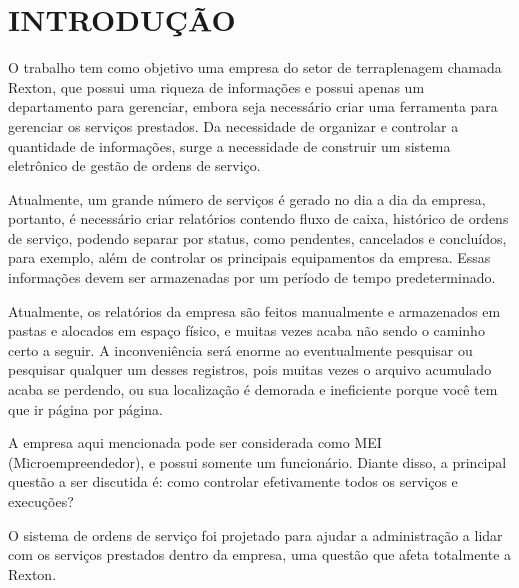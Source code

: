 \chapter*[INTRODUÇÃO]{INTRODUÇÃO}
O trabalho tem como objetivo uma empresa do setor de terraplenagem chamada Rexton, que possui uma riqueza de informações e possui apenas um departamento para gerenciar, embora seja necessário criar uma ferramenta para gerenciar os serviços prestados. Da necessidade de organizar e controlar a quantidade de informações, surge a necessidade de construir um sistema eletrônico de gestão de ordens de serviço.

Atualmente, um grande número de serviços é gerado no dia a dia da empresa, portanto, é necessário criar relatórios contendo fluxo de caixa, histórico de ordens de serviço, podendo separar por status, como pendentes, cancelados e concluídos, para exemplo, além de controlar os principais equipamentos da empresa. Essas informações devem ser armazenadas por um período de tempo predeterminado.

Atualmente, os relatórios da empresa são feitos manualmente e armazenados em pastas e alocados em espaço físico, e muitas vezes acaba não sendo o caminho certo a seguir. A inconveniência será enorme ao eventualmente pesquisar ou pesquisar qualquer um desses registros, pois muitas vezes o arquivo acumulado acaba se perdendo, ou sua localização é demorada e ineficiente porque você tem que ir página por página.

A empresa aqui mencionada pode ser considerada como MEI (Microempreendedor), e possui somente um funcionário. Diante disso, a principal questão a ser discutida é: como controlar efetivamente todos os serviços e execuções?

O sistema de ordens de serviço foi projetado para ajudar a administração a lidar com os serviços prestados dentro da empresa, uma questão que afeta totalmente a Rexton.